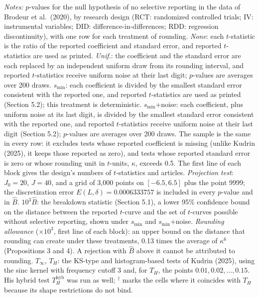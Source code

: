 \begin{table}[htbp]
\medskip
\begin{minipage}{\linewidth}
\footnotesize
\textit{Notes:} $p$-values for the null hypothesis of no selective reporting in the data of Brodeur et al.\ (2020), by research design (RCT: randomized controlled trials; IV: instrumental variables; DID: difference-in-differences; RDD: regression discontinuity), with one row for each treatment of rounding.
\textit{None}: each $t$-statistic is the ratio of the reported coefficient and standard error, and reported $t$-statistics are used as printed.
\textit{Unif.}: the coefficient and the standard error are each replaced by an independent uniform draw from its rounding interval, and reported $t$-statistics receive uniform noise at their last digit; $p$-values are averages over 200 draws.
$s_{\min}$: each coefficient is divided by the smallest standard error consistent with the reported one, and reported $t$-statistics are used as printed (Section 5.2); this treatment is deterministic.
$s_{\min}$+noise: each coefficient, plus uniform noise at its last digit, is divided by the smallest standard error consistent with the reported one, and reported $t$-statistics receive uniform noise at their last digit (Section 5.2); $p$-values are averages over 200 draws.
The sample is the same in every row: it excludes tests whose reported coefficient is missing (unlike Kudrin (2025), it keeps those reported as zero), and tests whose reported standard error is zero or whose rounding unit in $t$-units, $\kappa$, exceeds 0.5. The first line of each block gives the design's numbers of $t$-statistics and articles.
\textit{Projection test}: $J_0=20$, $J=40$, and a grid of 3,000 points on $[-6.5,6.5]$ plus the point 9999; the discretization error $E(L,\delta)=0.0006333757$ is included in every $p$-value and in $\widehat{B}$.
$10^3\widehat{B}$: the breakdown statistic (Section 5.1), a lower 95\% confidence bound on the distance between the reported $t$-curve and the set of $t$-curves possible without selective reporting, shown under $s_{\min}$ and $s_{\min}$+noise. \textit{Rounding allowance} ($\times 10^3$, first line of each block): an upper bound on the distance that rounding can create under these treatments, 0.13 times the average of $\kappa^6$ (Propositions 3 and 4). A rejection with $\widehat{B}$ above it cannot be attributed to rounding.
$T_\infty$, $T_H$: the KS-type and histogram-based tests of Kudrin (2025), using the sinc kernel with frequency cutoff 3 and, for $T_H$, the points $0.01,0.02,\ldots,0.15$. His hybrid test $T_H^{\mathrm{hyb}}$ was run as well; $^\dagger$ marks the cells where it coincides with $T_H$ because its shape restrictions do not bind.

\end{minipage}
\end{table}
